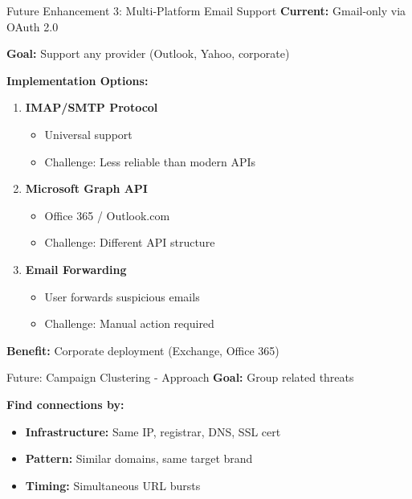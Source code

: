 \documentclass[aspectratio=169]{beamer}
\begin{document}
\begin{frame}{Future Enhancement 3: Multi-Platform Email Support}
\small
\textbf{Current:} Gmail-only via OAuth 2.0

\vspace{0.2cm}
\textbf{Goal:} Support any provider (Outlook, Yahoo, corporate)

\vspace{0.2cm}
\textbf{Implementation Options:}

\begin{enumerate}
    \scriptsize
    \item \textbf{IMAP/SMTP Protocol}
    \begin{itemize}
        \scriptsize
        \item Universal support
        \item Challenge: Less reliable than modern APIs
    \end{itemize}
    
    \item \textbf{Microsoft Graph API}
    \begin{itemize}
        \scriptsize
        \item Office 365 / Outlook.com
        \item Challenge: Different API structure
    \end{itemize}
    
    \item \textbf{Email Forwarding}
    \begin{itemize}
        \scriptsize
        \item User forwards suspicious emails
        \item Challenge: Manual action required
    \end{itemize}
\end{enumerate}

\vspace{0.1cm}
\scriptsize
\textbf{Benefit:} Corporate deployment (Exchange, Office 365)
\end{frame}

\begin{frame}{Future: Campaign Clustering - Approach}
\vspace{-0.5cm}
\scriptsize
\textbf{Goal:} Group related threats
\vspace{-0.4cm}

\textbf{Find connections by:}
\begin{itemize}
    \scriptsize
    \setlength\itemsep{-0.25em}
    \item \textbf{Infrastructure:} Same IP, registrar, DNS, SSL cert
    \item \textbf{Pattern:} Similar domains, same target brand
    \item \textbf{Timing:} Simultaneous URL bursts
\end{itemize}
\vspace{-0.2cm}
\end{frame}
\end{document}
